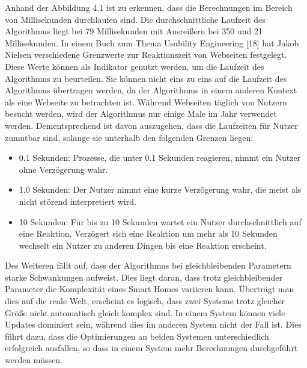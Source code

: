 \FloatBarrier
Anhand der Abbildung 4.1 ist zu erkennen, dass die Berechnungen im Bereich von Millisekunden durchlaufen sind. Die durchschnittliche Laufzeit des Algorithmus liegt
bei 79 Millisekunden mit Ausreißern bei 350 und 21 Millisekunden. In einem Buch zum Thema Usability Engineering [18] hat Jakob Nielsen verschiedene Grenzwerte zur
Reaktionszeit von Webseiten festgelegt. Diese Werte können als Indikator genutzt werden, um die Laufzeit des Algorithmus zu beurteilen. Sie können 
nicht eins zu eins auf die Laufzeit des Algorithmus übertragen werden, da der Algorithmus in einem anderen Kontext als eine Webseite zu betrachten ist.
Während Webseiten täglich von Nutzern besucht werden, wird der Algorithmus nur einige Male im Jahr verwendet werden. Dementsprechend ist davon
auszugehen, dass die Laufzeiten für Nutzer zumutbar sind, solange sie unterhalb den folgenden Grenzen liegen:
\begin{itemize}
\item 0.1 Sekunden: Prozesse, die unter 0.1 Sekunden reagieren, nimmt ein Nutzer ohne Verzögerung wahr.
\item 1.0 Sekunden: Der Nutzer nimmt eine kurze Verzögerung wahr, die meist als nicht störend interpretiert wird.
\item 10 Sekunden: Für bis zu 10 Sekunden wartet ein Nutzer durchschnittlich auf eine Reaktion. Verzögert sich eine Reaktion um mehr als 10 Sekunden wechselt ein Nutzer
zu anderen Dingen bis eine Reaktion erscheint.
\end{itemize}

Des Weiteren fällt auf, dass der Algorithmus bei gleichbleibenden Parametern starke Schwankungen aufweist. Dies liegt daran, dass trotz
gleichbleibender Parameter die Komplexität eines Smart Homes variieren kann. Überträgt man dies auf die reale Welt, erscheint es logisch, dass
zwei Systeme trotz gleicher Größe nicht automatisch gleich komplex sind. In einem System können viele
Updates dominiert sein, während dies im anderen System nicht der Fall ist. Dies führt dazu, dass die Optimierungen an beiden Systemen unterschiedlich erfolgreich
ausfallen, so dass in einem System mehr Berechnungen durchgeführt werden müssen.

\newpage
